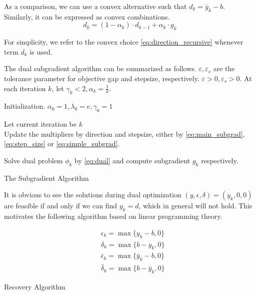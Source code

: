 \documentclass[../main]{subfiles}
\begin{document}
As a comparison, we can use a convex alternative such that \(d_k = \bar y_k - b\).
Similarly, it can be expressed as convex combinations.
\begin{equation}\label{eq:direction_recursive}
  d_k = (1-\alpha_k) \cdot d_{k-1} + \alpha_k\cdot g_k
\end{equation}

For simplicity, we refer to the convex choice \eqref{eq:direction_recursive} whenever term \(d_k\) is used.

The dual subgradient algorithm can be summarized as follows.
\(\varepsilon,\varepsilon_s\) are the tolerance parameter for objective gap and stepsize, respectively.
\(\varepsilon > 0 ,\varepsilon_s > 0\). At each iteration \(k\), let \(\gamma_k < 2, \alpha_k = \frac{1}{k}\).

\begin{algorithm}[H]
  \SetAlgoLined
  Initialization. \(\alpha_0 = 1, \lambda_0 = e, \gamma_0 = 1\)  \\
  {
    Let current iteration be \(k\)\\
    Update the multipliers by direction and stepsize, either by \eqref{eq:main_subgrad}, \eqref{eq:step_size} or \eqref{eq:simple_subgrad}.

    Solve dual problem \(\phi_k\) by \eqref{eq:dual}
    and compute subgradient \(g_k\) respectively.
  }
  \caption{The Subgradient Algorithm}
\end{algorithm}

It is obvious to see the solutions during dual optimization
\((y, \epsilon, \delta) = (y_k, 0, 0)\) are feasible if and only if we
can find \(y_k = d\), which in general will not hold. This motivates the following
algorithm based on linear programming theory.

\begin{algorithm}[H]\label{alg:recovery}
  \SetAlgoLined
  \begin{equation}\label{eq:recovery}
    \begin{aligned}
       & \epsilon_k = \max\{y_k - b, 0\}           \\
       & \delta_k = \max\{b - y_k, 0\}             \\
       & \bar \epsilon_k = \max\{\bar y_k - b, 0\} \\
       & \bar \delta_k = \max\{b - \bar y_k, 0\}
    \end{aligned}\end{equation}
  \caption{Recovery Algorithm}
\end{algorithm}
\end{document}
